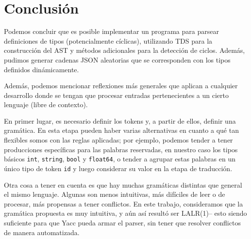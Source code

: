 \section{Conclusión}
\label{sec:conc}

    Podemos concluir que es posible implementar un programa para parsear definiciones de tipos (potencialmente cíclicas), utilizando TDS para la construcción del AST y métodos adicionales para la detección de ciclos. Además, pudimos generar cadenas JSON aleatorias que se corresponden con los tipos definidos dinámicamente.
    
    Además, podemos mencionar reflexiones más generales que aplican a cualquier desarrollo donde se tengan que procesar entradas pertenecientes a un cierto lenguaje (libre de contexto).
    
    En primer lugar, es necesario definir los tokens y, a partir de ellos, definir una gramática. En esta etapa pueden haber varias alternativas en cuanto a qué tan flexibles somos con las reglas aplicadas; por ejemplo, podemos tender a tener producciones específicas para las palabras reservadas, en nuestro caso los tipos básicos \texttt{int}, \texttt{string}, \texttt{bool} y \texttt{float64}, o tender a agrupar estas palabras en un único tipo de token \texttt{id} y luego considerar su valor en la etapa de traducción.
    
    Otra cosa a tener en cuenta es que hay muchas gramáticas distintas que general el mismo lenguaje. Algunas son menos intuitivas, más difíciles de leer o de procesar, más propensas a tener conflictos. En este trabajo, consideramos que la gramática propuesta es muy intuitiva, y aún así resultó ser LALR(1)-- esto siendo suficiente para que Yacc pueda armar el parser, sin tener que resolver conflictos de manera automatizada.